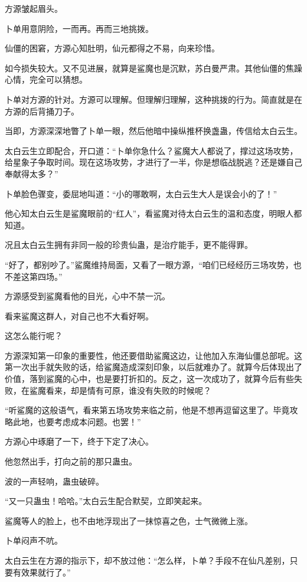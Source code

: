 \begin{this_body}
方源皱起眉头。

卜单用意阴险，一而再。再而三地挑拨。

仙僵的困窘，方源心知肚明，仙元都得之不易，向来珍惜。

如今损失较大。又不见进展，就算是鲨魔也是沉默，苏白曼严肃。其他仙僵的焦躁心情，完全可以猜想。

卜单对方源的针对。方源可以理解。但理解归理解，这种挑拨的行为。简直就是在方源的后背捅刀子。

当即，方源深深地瞥了卜单一眼，然后他暗中操纵推杯换盏蛊，传信给太白云生。

太白云生立即配合，开口道：“卜单你急什么？鲨魔大人都说了，撑过这场攻势，给星象子争取时间。现在这场攻势，才进行了一半，你是想临战脱逃？还是嫌自己奉献得太多？”

卜单脸色骤变，委屈地叫道：“小的哪敢啊，太白云生大人是误会小的了！”

他心知太白云生是鲨魔眼前的“红人”，看鲨魔对待太白云生的温和态度，明眼人都知道。

况且太白云生拥有非同一般的珍贵仙蛊，是治疗能手，更不能得罪。

“好了，都别吵了。”鲨魔维持局面，又看了一眼方源，“咱们已经经历三场攻势，也不差这第四场。”

方源感受到鲨魔看他的目光，心中不禁一沉。

看来鲨魔这群人，对自己也不大看好啊。

这怎么能行呢？

方源深知第一印象的重要性，他还要借助鲨魔这边，让他加入东海仙僵总部呢。这第一次出手就失败的话，给鲨魔造成深刻印象，以后就难办了。就算今后体现出了价值，落到鲨魔的心中，也是要打折扣的。反之，这一次成功了，就算今后有些失败，在鲨魔看来，却是情有可原，谁没有失败的时候呢？

“听鲨魔的这般语气，看来第五场攻势来临之前，他是不想再逗留这里了。毕竟攻略此地，也要考虑成本问题。也罢！”

方源心中琢磨了一下，终于下定了决心。

他忽然出手，打向之前的那只蛊虫。

波的一声轻响，蛊虫破碎。

“又一只蛊虫！哈哈。”太白云生配合默契，立即笑起来。

鲨魔等人的脸上，也不由地浮现出了一抹惊喜之色，士气微微上涨。

卜单闷声不吭。

太白云生在方源的指示下，却不放过他：“怎么样，卜单？手段不在仙凡差别，只要有效果就行了。”


\end{this_body}
